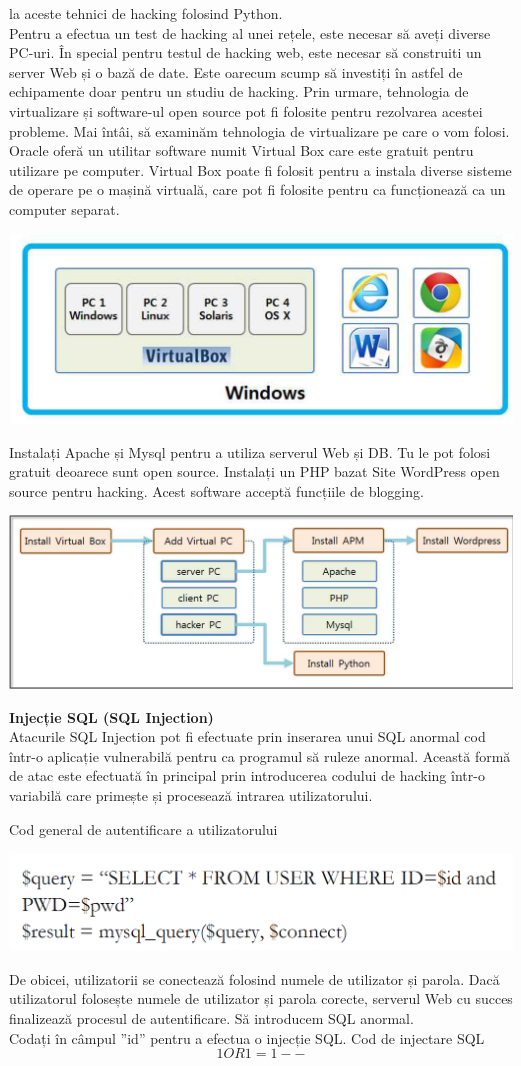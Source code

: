 \documentclass[oneside,20pt]{article}          %
\begin{document}
la aceste tehnici de hacking folosind Python.\\
Pentru a efectua un test de hacking al unei rețele, este necesar să aveți
diverse PC-uri. În special pentru testul de hacking web, este necesar să
construiti un server Web și o bază de date. Este oarecum scump să
investiți în astfel de echipamente doar pentru un studiu de hacking. Prin urmare,
tehnologia de virtualizare și software-ul open source pot fi folosite pentru
rezolvarea acestei probleme. Mai întâi, să examinăm tehnologia de virtualizare
pe care o vom folosi. Oracle oferă un utilitar software numit Virtual Box
care este gratuit pentru utilizare pe computer. Virtual Box poate fi folosit pentru a instala
diverse sisteme de operare pe o mașină virtuală, care pot fi folosite pentru
ca funcționează ca un computer separat.
\begin{center}
\includegraphics[height = 3 cm]{2.png}
\end{center}
Instalați Apache și Mysql pentru a utiliza serverul Web și DB. Tu
le pot folosi gratuit deoarece sunt open source. Instalați un PHP bazat
Site WordPress open source pentru hacking. Acest software acceptă funcțiile de blogging.
\begin{center}
\includegraphics[height = 3 cm]{3.png}
\end{center}
\textbf{Injecție SQL (SQL Injection)}\\
Atacurile SQL Injection pot fi efectuate prin inserarea unui SQL anormal
cod într-o aplicație vulnerabilă pentru ca programul să ruleze anormal.
Această formă de atac este efectuată în principal prin introducerea codului de hacking
într-o variabilă care primește și procesează intrarea utilizatorului.

Cod general de autentificare a utilizatorului
\begin{center}
\includegraphics[height = 1 cm]{4.png}
\end{center}
De obicei, utilizatorii se conectează folosind numele de utilizator și parola. Dacă utilizatorul
folosește numele de utilizator și parola corecte, serverul Web cu succes finalizează procesul de autentificare. Să introducem SQL anormal.\\
Codați în câmpul ”id” pentru a efectua o injecție SQL.
 Cod de injectare SQL\\
$$1 OR 1=1 --$$
\end{document}
